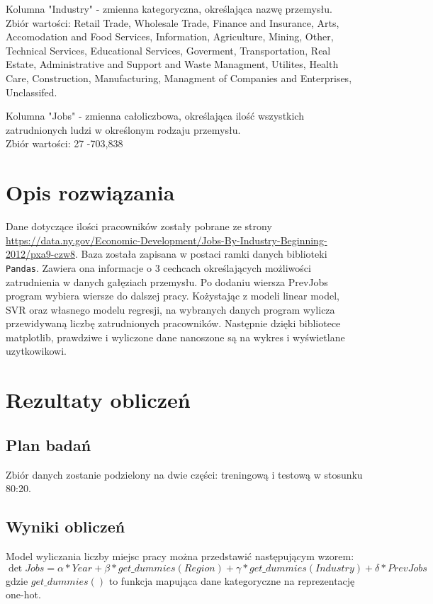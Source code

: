 \documentclass[10pt]{article}
\begin{document}
    Kolumna "Industry" - zmienna kategoryczna, określająca nazwę przemysłu. \\
    Zbiór wartości: Retail Trade, Wholesale Trade, Finance and Insurance, Arts, Accomodation and Food Services, Information, Agriculture, Mining, Other, Technical Services, Educational Services, Goverment, Transportation, Real Estate, Administrative and Support and Waste Managment, Utilites, Health Care, Construction, Manufacturing, Managment of Companies and Enterprises, Unclassifed.
    
    Kolumna "Jobs" - zmienna całoliczbowa, określająca ilość wszystkich zatrudnionych ludzi w określonym rodzaju przemysłu. \\
    Zbiór wartości: 27 -703,838
    
    
\section{Opis rozwiązania}

Dane dotyczące ilości pracowników zostały pobrane ze strony\\ \url{https://data.ny.gov/Economic-Development/Jobs-By-Industry-Beginning-2012/pxa9-czw8}. Baza została zapisana w postaci ramki danych biblioteki \texttt{Pandas}. Zawiera ona informacje o 3 cechcach określających możliwości zatrudnienia w danych gałęziach przemysłu.
    Po dodaniu wiersza PrevJobs program wybiera wiersze do dalszej pracy.
Kożystając z modeli linear model, SVR oraz własnego modelu regresji, na wybranych danych program wylicza przewidywaną liczbę zatrudnionych pracowników. Następnie dzięki bibliotece matplotlib, prawdziwe i wyliczone dane nanoszone są na wykres i wyświetlane uzytkowikowi. 

\section{Rezultaty obliczeń}

\subsection{Plan badań}
Zbiór danych zostanie podzielony na dwie części: treningową i testową w stosunku 80:20. 


\subsection{Wyniki obliczeń} 
Model wyliczania liczby miejsc pracy można przedstawić następującym wzorem: 
\begin{equation}
\det Jobs = \alpha * Year + \beta * get\_dummies(Region) + \gamma * get\_dummies(Industry) + \delta * PrevJobs 
\label{eq:wzor_wazny}
\end{equation}
gdzie $get\_dummies()$ to funkcja mapująca dane kategoryczne na reprezentację one-hot.
\end{document}
